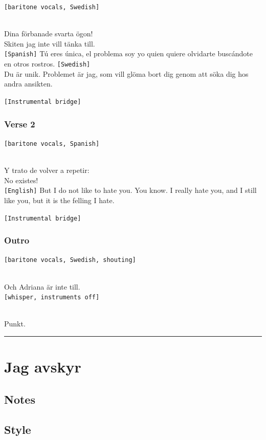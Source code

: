 \texttt{{[}baritone\ vocals,\ Swedish{]}}\strut \\
Dina förbanade svarta ögon!\\
Skiten jag inte vill tänka till.\\
\texttt{{[}Spanish{]}} Tú eres única, el problema soy yo quien quiere
olvidarte buscándote en otros rostros. \texttt{{[}Swedish{]}}\\
Du är unik. Problemet är jag, som vill glöma bort dig genom att söka dig
hos andra ansikten.

\texttt{{[}Instrumental\ bridge{]}}

\subsubsection{Verse 2}\label{verse-2-16}

\texttt{{[}baritone\ vocals,\ Spanish{]}}\strut \\
Y trato de volver a repetir:\\
No existes!\\
\texttt{{[}English{]}} But I do not like to hate you. You know. I really
hate you, and I still like you, but it is the felling I hate.

\texttt{{[}Instrumental\ bridge{]}}

\subsubsection{Outro}\label{outro-8}

\texttt{{[}baritone\ vocals,\ Swedish,\ shouting{]}}\strut \\
Och Adriana är inte till.\\
\texttt{{[}whisper,\ instruments\ off{]}}\strut \\
Punkt.

\begin{center}\rule{0.5\linewidth}{0.5pt}\end{center}

\section{Jag avskyr}\label{jag-avskyr}

\subsection{Notes}\label{notes-28}

\subsection{Style}\label{style-27}

